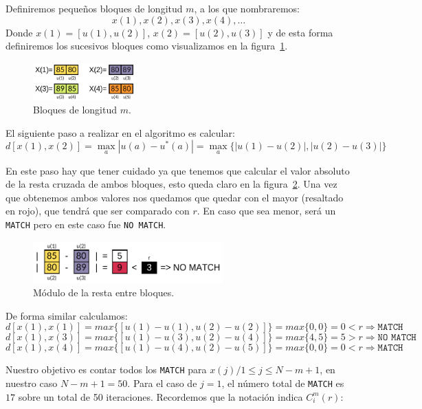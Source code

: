 \documentclass[a4paper,12pt]{article}
\begin{document}
Definiremos pequeños bloques de longitud $m$, a los que nombraremos:
$$x(1), x(2), x(3), x(4), \dots$$
Donde $x(1)=[u(1),u(2)]$, $x(2)=[u(2),u(3)]$ y de esta forma definiremos los sucesivos bloques como visualizamos en la figura~\ref{fig:apen_2}.

\begin{figure}[H]
	\begin{center}
		\includegraphics[width=0.35\textwidth]{apen_2.png}
		\caption{Bloques de longitud $m$.}
		\label{fig:apen_2}
	\end{center}
\end{figure}

El siguiente paso a realizar en el algoritmo es calcular:
$$d[x(1),x(2)]=\max_a |u(a)-u^*(a)|=\max_a\{|u(1)-u(2)|,|u(2)-u(3)|\}$$

En este paso hay que tener cuidado ya que tenemos que calcular el valor absoluto de la resta cruzada de ambos bloques, esto queda claro en la figura~\ref{fig:apen_3}. Una vez que obtenemos ambos valores nos quedamos que quedar con el mayor (resaltado en rojo), que tendrá que ser comparado con $r$. En caso que sea menor, será un \texttt{MATCH} pero en este caso fue \texttt{NO MATCH}.

\begin{figure}[H]
	\begin{center}
		\includegraphics[width=0.65\textwidth]{apen_3.png}
		\caption{Módulo de la resta entre bloques.}
		\label{fig:apen_3}
	\end{center}
\end{figure}

\clearpage

De forma similar calculamos:
$$d[x(1),x(1)] = max \{[u(1)-u(1),u(2)-u(2)]\} = max\{0,0\}=0<r \Rightarrow \texttt{MATCH}$$
$$d[x(1),x(3)] = max \{[u(1)-u(3),u(2)-u(4)]\} = max\{4,5\}=5>r \Rightarrow \texttt{NO MATCH}$$
$$d[x(1),x(4)] = max \{[u(1)-u(4),u(2)-u(5)]\} = max\{0,0\}=0<r \Rightarrow \texttt{MATCH}$$

Nuestro objetivo es contar todos los \texttt{MATCH} para $x(j)/1 \leq j \leq N-m+1$, en nuestro caso $N-m+1=50$.
Para el caso de $j=1$, el número total de \texttt{MATCH} es $17$ sobre un total de 50 iteraciones.
Recordemos que la notación indica $C_i^m(r)$:
\end{document}
